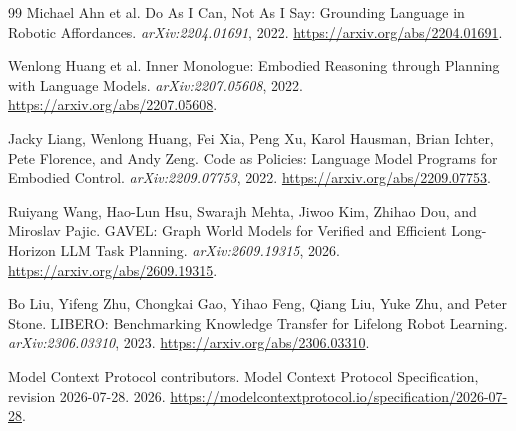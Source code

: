 \begin{thebibliography}{99}
Michael Ahn et al.
Do As I Can, Not As I Say: Grounding Language in Robotic Affordances.
\emph{arXiv:2204.01691}, 2022.
\url{https://arxiv.org/abs/2204.01691}.

Wenlong Huang et al.
Inner Monologue: Embodied Reasoning through Planning with Language Models.
\emph{arXiv:2207.05608}, 2022.
\url{https://arxiv.org/abs/2207.05608}.

Jacky Liang, Wenlong Huang, Fei Xia, Peng Xu, Karol Hausman, Brian Ichter, Pete Florence, and Andy Zeng.
Code as Policies: Language Model Programs for Embodied Control.
\emph{arXiv:2209.07753}, 2022.
\url{https://arxiv.org/abs/2209.07753}.

Ruiyang Wang, Hao-Lun Hsu, Swarajh Mehta, Jiwoo Kim, Zhihao Dou, and Miroslav Pajic.
GAVEL: Graph World Models for Verified and Efficient Long-Horizon LLM Task Planning.
\emph{arXiv:2609.19315}, 2026.
\url{https://arxiv.org/abs/2609.19315}.

Bo Liu, Yifeng Zhu, Chongkai Gao, Yihao Feng, Qiang Liu, Yuke Zhu, and Peter Stone.
LIBERO: Benchmarking Knowledge Transfer for Lifelong Robot Learning.
\emph{arXiv:2306.03310}, 2023.
\url{https://arxiv.org/abs/2306.03310}.

Model Context Protocol contributors.
Model Context Protocol Specification, revision 2026-07-28.
2026.
\url{https://modelcontextprotocol.io/specification/2026-07-28}.

\end{thebibliography}
